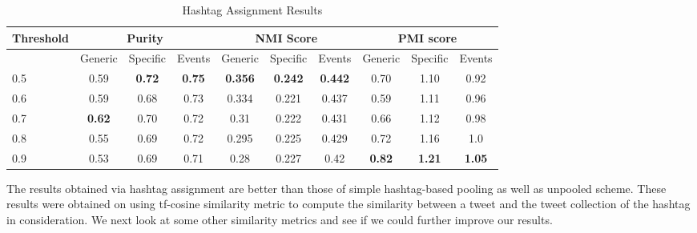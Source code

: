 \documentclass[10pt,a5paper,twoside]{article}
\begin{document}
\begin{table}[!h]
\setcounter{table}{11}
\centering
\resizebox{14cm}{!} 
{
	\begin{tabular}{|l|ccc|ccc|ccc|}
	\hline
	\footnotesize{Threshold}  & \multicolumn {3}{c}{Purity} & \multicolumn {3}{c}{NMI Score} & \multicolumn {3}{c|}{PMI score}\\
	\hline
	 & Generic & Specific & Events &  Generic & Specific & Events &  Generic & Specific & Events\\
	\hline
	0.5 & 0.59 & \textbf{0.72} & \textbf{0.75} & \textbf{0.356} & \textbf{0.242} & \textbf{0.442} & 0.70 & 1.10 & 0.92 \\
	\hline
	0.6 & 0.59 & 0.68 & 0.73 & 0.334 & 0.221 & 0.437 & 0.59 & 1.11 & 0.96 \\
	\hline
	0.7 & \textbf{0.62} & 0.70 & 0.72 & 0.31 & 0.222 & 0.431 & 0.66 & 1.12 & 0.98 \\
	\hline
	0.8 & 0.55 & 0.69 & 0.72 & 0.295 & 0.225 & 0.429 & 0.72 & 1.16 & 1.0 \\
	\hline
	0.9 & 0.53 & 0.69 & 0.71 & 0.28 & 0.227 & 0.42 & \textbf{0.82} & \textbf{1.21} & \textbf{1.05} \\
	\hline
	\end{tabular}
}
\caption{Hashtag Assignment Results}\label{Table}
\end{table}

The results obtained via hashtag assignment are better than those of simple hashtag-based pooling as well as unpooled scheme. These results were obtained on using tf-cosine similarity metric to compute the similarity between a tweet and the tweet collection of the hashtag in consideration. We next look at some other similarity metrics and see if we could further improve our results.
\end{document}
